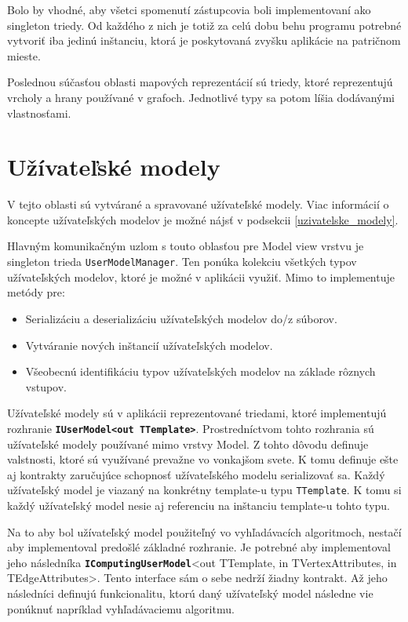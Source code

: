 Bolo by vhodné, aby všetci spomenutí zástupcovia boli implementovaní ako singleton triedy. Od každého z nich je totiž za celú dobu behu programu potrebné vytvoriť iba jedinú inštanciu, ktorá je poskytovaná zvyšku aplikácie na patričnom mieste.

Poslednou súčasťou oblasti mapových reprezentácií sú triedy, ktoré reprezentujú vrcholy a hrany používané v grafoch. Jednotlivé typy sa potom líšia dodávanými vlastnosťami.   

\section{Užívateľské modely}

V tejto oblasti sú vytvárané a spravované užívateľské modely. Viac informácií o koncepte užívateľských modelov je možné nájsť v podsekcii \ref{uzivatelske_modely}.

Hlavným komunikačným uzlom s touto oblasťou pre Model view vrstvu je singleton trieda \texttt{UserModelManager}. Ten ponúka kolekciu všetkých typov užívateľských modelov, ktoré je možné v aplikácii využiť. Mimo to implementuje metódy pre:
\begin{itemize}
    \item Serializáciu a deserializáciu užívateľských modelov do/z súborov.
    \item Vytváranie nových inštancií užívateľských modelov.
    \item Všeobecnú identifikáciu typov užívateľských modelov na základe rôznych vstupov.
\end{itemize}

\bigskip

Užívateľské modely sú v aplikácii reprezentované triedami, ktoré implementujú rozhranie \textbf{\texttt{IUserModel<out TTemplate>}}.  Prostredníctvom tohto rozhrania sú užívateľské modely používané mimo vrstvy Model. Z tohto dôvodu definuje valstnosti, ktoré sú využívané prevažne vo vonkajšom svete. K tomu definuje ešte aj kontrakty zaručujúce schopnosť užívateľského modelu serializovať sa. Každý užívateľský model je viazaný na konkrétny template-u typu \texttt{TTemplate}. K tomu si každý užívateľský model nesie aj referenciu na inštanciu template-u tohto typu.

Na to aby bol užívateľský model použiteľný vo vyhľadávacích algoritmoch, nestačí aby implementoval predošlé základné rozhranie. Je potrebné aby implementoval jeho následníka \textbf{\texttt{IComputingUserModel}}<out TTemplate, in TVertexAttributes, in TEdgeAttributes>. Tento interface sám o sebe nedrží žiadny kontrakt. Až jeho následníci definujú funkcionalitu, ktorú daný užívateľský model následne vie ponúknuť napríklad vyhľadávaciemu algoritmu. 

